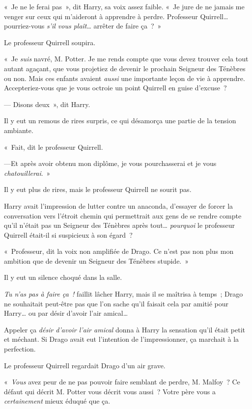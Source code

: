 «~Je ne le ferai pas~», dit Harry, sa voix assez faible. «~Je jure de ne jamais me venger sur ceux qui m'aideront à apprendre à perdre. Professeur Quirrell… pourriez-vous \emph{s'il vous plaît}… arrêter de faire ça~?~»

Le professeur Quirrell soupira.

«~Je \emph{suis} navré, M. Potter. Je me rends compte que vous devez trouver cela tout autant agaçant, que vous projetiez de devenir le prochain Seigneur des Ténèbres ou non. Mais ces enfants avaient \emph{aussi} une importante leçon de vie à apprendre. Accepteriez-vous que je vous octroie un point Quirrell en guise d'excuse~?

--- Disons deux~», dit Harry.

Il y eut un remous de rires surpris, ce qui désamorça une partie de la tension ambiante.

«~Fait, dit le professeur Quirrell.

---Et après avoir obtenu mon diplôme, je vous pourchasserai et je vous \emph{chatouillerai}.~»

Il y eut plus de rires, mais le professeur Quirrell ne sourit pas.

Harry avait l'impression de lutter contre un anaconda, d'essayer de forcer la conversation vers l'étroit chemin qui permettrait aux gens de se rendre compte qu'il n'était pas un Seigneur des Ténèbres après tout… \emph{pourquoi} le professeur Quirrell était-il si suspicieux à son égard~?

«~Professeur, dit la voix non amplifiée de Drago. Ce n'est pas non plus mon ambition que de devenir un Seigneur des Ténèbres stupide.~»

Il y eut un silence choqué dans la salle.

\emph{Tu n'as pas à faire ça~!} faillit lâcher Harry, mais il se maîtrisa à temps~; Drago ne souhaitait peut-être pas que l'on sache qu'il faisait cela par amitié pour Harry… ou par désir d'avoir l'air amical…

Appeler ça \emph{désir d'avoir l'air amical} donna à Harry la sensation qu'il était petit et méchant. Si Drago avait eut l'intention de l'impressionner, ça marchait à la perfection.

Le professeur Quirrell regardait Drago d'un air grave.

«~\emph{Vous} avez peur de ne pas pouvoir faire semblant de perdre, M. Malfoy~? Ce défaut qui décrit M. Potter vous décrit vous aussi~? Votre père vous a \emph{certainement} mieux éduqué que ça.

